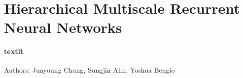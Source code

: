 \section{Hierarchical Multiscale Recurrent Neural Networks
}
\paragraph{textit}{Authors}: Junyoung Chung, Sungjin Ahn, Yoshua Bengio \cite{chung_hierarchical_2017} \\

